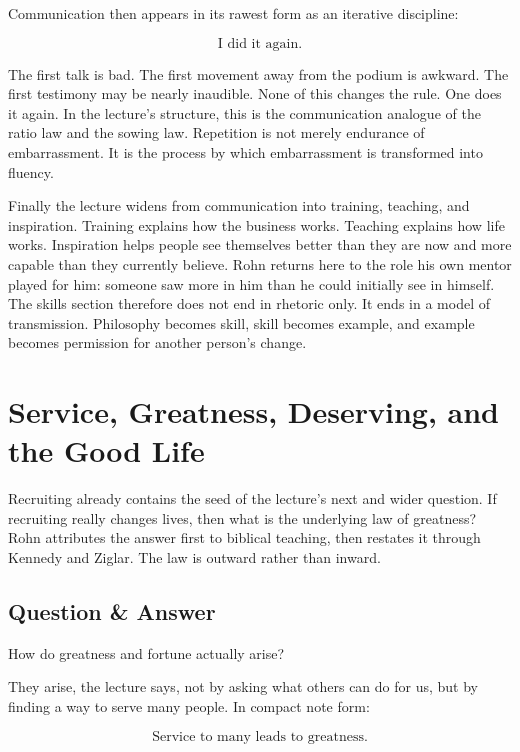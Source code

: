 Communication then appears in its rawest form as an iterative discipline:

\begin{equation}
\text{I did it again.}
\end{equation}

The first talk is bad. The first movement away from the podium is awkward. The first testimony may be nearly inaudible. None of this changes the rule. One does it again. In the lecture's structure, this is the communication analogue of the ratio law and the sowing law. Repetition is not merely endurance of embarrassment. It is the process by which embarrassment is transformed into fluency.

Finally the lecture widens from communication into training, teaching, and inspiration. Training explains how the business works. Teaching explains how life works. Inspiration helps people see themselves better than they are now and more capable than they currently believe. Rohn returns here to the role his own mentor played for him: someone saw more in him than he could initially see in himself. The skills section therefore does not end in rhetoric only. It ends in a model of transmission. Philosophy becomes skill, skill becomes example, and example becomes permission for another person's change.

\section{Service, Greatness, Deserving, and the Good Life}

Recruiting already contains the seed of the lecture's next and wider question. If recruiting really changes lives, then what is the underlying law of greatness? Rohn attributes the answer first to biblical teaching, then restates it through Kennedy and Ziglar. The law is outward rather than inward.

\subsection{Question \& Answer}

How do greatness and fortune actually arise?

They arise, the lecture says, not by asking what others can do for us, but by finding a way to serve many people. In compact note form:

\begin{equation}
\text{Service to many leads to greatness.}
\end{equation}

